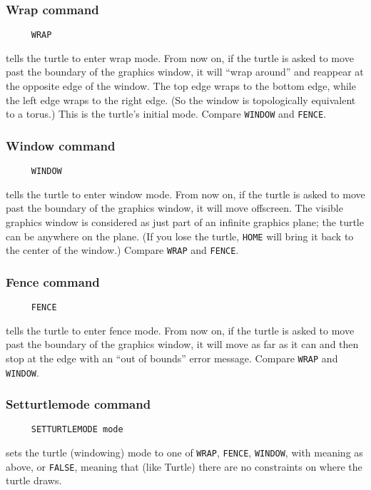 \subsubsection*{Wrap command}
\begin{verbatim}
     WRAP
\end{verbatim}
tells the turtle to enter wrap mode.  From now on, if the turtle is
asked to move past the boundary of the graphics window, it will ``wrap
around'' and reappear at the opposite edge of the window.  The top
edge wraps to the bottom edge, while the left edge wraps to the right
edge.  (So the window is topologically equivalent to a torus.)  This
is the turtle's initial mode.  Compare \texttt{WINDOW} and
\texttt{FENCE}.

\subsubsection*{Window command}
\begin{verbatim}
     WINDOW
\end{verbatim}
tells the turtle to enter window mode.  From now on, if the turtle is
asked to move past the boundary of the graphics window, it will move
offscreen.  The visible graphics window is considered as just part of
an infinite graphics plane; the turtle can be anywhere on the plane.
(If you lose the turtle, \texttt{HOME} will bring it back to the
center of the window.)  Compare \texttt{WRAP} and \texttt{FENCE}.

\subsubsection*{Fence command}
\begin{verbatim}
     FENCE
\end{verbatim}
tells the turtle to enter fence mode.  From now on, if the turtle is
asked to move past the boundary of the graphics window, it will move
as far as it can and then stop at the edge with an ``out of bounds''
error message.  Compare \texttt{WRAP} and \texttt{WINDOW}.

\subsubsection*{Setturtlemode command}
\begin{verbatim}
     SETTURTLEMODE mode
\end{verbatim}
sets the turtle (windowing) mode to one of \texttt{WRAP},
\texttt{FENCE}, \texttt{WINDOW}, with meaning as above, or
\texttt{FALSE}, meaning that (like Turtle) there are no constraints on
where the turtle draws.

